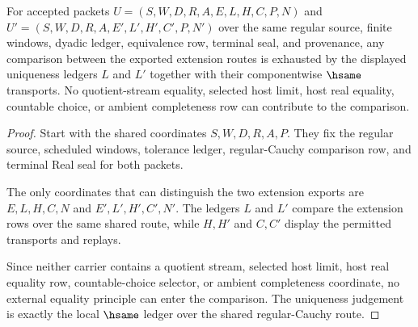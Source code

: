 \begin{theorem}
\label{thm:regular-cauchy-completion-universal-uniqueness-ledger}
For accepted packets $U=(S,W,D,R,A,E,L,H,C,P,N)$ and $U'=(S,W,D,R,A,E',L',H',C',P,N')$ over the same regular source, finite windows, dyadic ledger, equivalence row, terminal seal, and provenance, any comparison between the exported extension routes is exhausted by the displayed uniqueness ledgers $L$ and $L'$ together with their componentwise $\hsame$ transports. No quotient-stream equality, selected host limit, host real equality, countable choice, or ambient completeness row can contribute to the comparison.
\end{theorem}
\begin{proof}
Start with the shared coordinates $S,W,D,R,A,P$. They fix the regular source, scheduled windows, tolerance ledger, regular-Cauchy comparison row, and terminal Real seal for both packets.

The only coordinates that can distinguish the two extension exports are $E,L,H,C,N$ and $E',L',H',C',N'$. The ledgers $L$ and $L'$ compare the extension rows over the same shared route, while $H,H'$ and $C,C'$ display the permitted transports and replays.

Since neither carrier contains a quotient stream, selected host limit, host real equality row, countable-choice selector, or ambient completeness coordinate, no external equality principle can enter the comparison. The uniqueness judgement is exactly the local $\hsame$ ledger over the shared regular-Cauchy route.
\end{proof}

